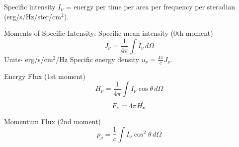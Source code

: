 Specific intensity $I_{\nu}$ = energy per time per area per frequency per
steradian (erg/s/Hz/ster/cm$^2$).

Moments of Specific Intensity:\newline
Specific mean intensity (0th moment)\newline
\begin{displaymath}J_{\nu}=\frac{1}{4\pi}\int I_{\nu}\,d\Omega \end{displaymath}
Units- erg/s/cm$^2$/Hz\newline
Specific energy density $u_{\nu}=\frac{4\pi}{c}J_{\nu}$.

Energy Flux (1st moment)\newline
\begin{displaymath}H_{\nu}=\frac{1}{4\pi}\int I_{\nu}\cos \theta\,d\Omega \end{displaymath}
\begin{displaymath}F_{\nu}=4\pi \vec{H_{\nu}} \end{displaymath}

Momentum Flux (2nd moment)\newline
\begin{displaymath}p_{\nu}=\frac{1}{c}\int I_{\nu}\cos^2 \theta\,d\Omega  \end{displaymath}
